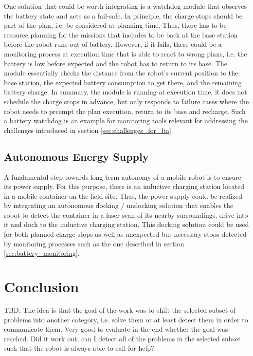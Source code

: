 \documentclass[english, master, utf8]{base/thesis_KBS}
\begin{document}
One solution that could be worth integrating is a watchdog module that observes the battery state and acts as a fail-safe. In principle, the charge stops should
be part of the plan, i.e. be considered at planning time. Thus, there has to be resource planning for the missions that includes to be back at the base station before
the robot runs out of battery. However, if it fails, there could be a monitoring process at execution time that is able to react to wrong plans, i.e. the battery is
low before expected and the robot has to return to its base. The module essentially checks the distance from the robot's current position to the base station, 
the expected battery consumption to get there, and the remaining battery charge. In summary, the module is running at execution time, it does not schedule the 
charge stops in advance, but only responds to failure cases where the robot needs to preempt the plan execution, return to its base and recharge.
Such a battery watchdog is an example for monitoring tools relevant for addressing the challenges introduced in section \ref{sec:challenges_for_lta}.

\section{Autonomous Energy Supply}
\label{sec:docking_solution}

A fundamental step towards long-term autonomy of a mobile robot is to ensure its power supply.
For this purpose, there is an inductive charging station located in a mobile container on the field site.
Thus, the power supply could be realized by integrating an autonomous docking / undocking solution that enables the robot to detect
the container in a laser scan of its nearby surroundings, drive into it and dock to the inductive charging station.
This docking solution could be used for both planned charge stops as well as unexpected but necessary stops detected by monitoring processes such
as the one described in section \ref{sec:battery_monitoring}.

\chapter{Conclusion}

TBD.\newline
The idea is that the goal of the work was to shift the selected subset of problems into another category, i.e. solve them or at least detect them in order to communicate them.
Very good to evaluate in the end whether the goal was reached. Did it work out, can I detect all of the problems in the selected subset such that the robot is always able to call
for help?
\end{document}
